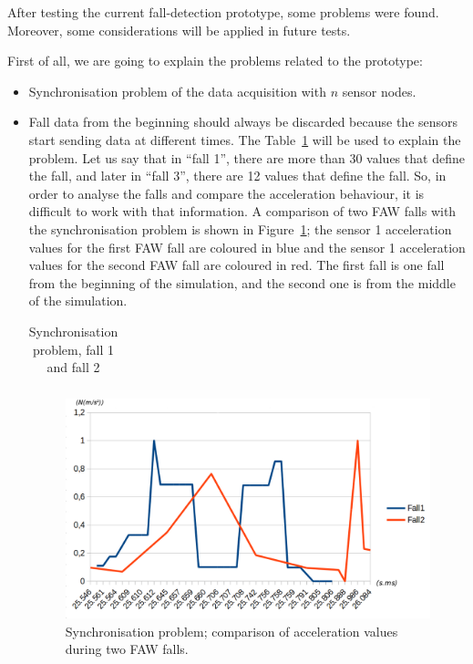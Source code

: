 \documentclass[journal]{IEEEtran}
\begin{document}
After testing the current fall-detection prototype, some problems were 
found. Moreover, some considerations will be applied in future tests.

First of all, we are going to explain the problems related to the prototype: 

\begin{itemize}
 \item Synchronisation problem of the data acquisition with $n$ sensor nodes.
 \item Fall data from the beginning should always be discarded because
   the sensors start sending data at different times. The
   Table~\ref{tabla:Synchro} will be used to explain the problem. Let
   us say  
 that in ``fall 1'', there are more than 30 values that define the fall, and later in ``fall 3'', there are 
 12 values that define the fall. So, in order to analyse the falls and compare the acceleration behaviour, it is 
 difficult to work with that information. A comparison of two FAW falls with the synchronisation problem is shown
 in Figure~\ref{fig:synchronisation1}; the sensor 1 acceleration values for the first FAW fall are coloured in blue and the
 sensor 1 acceleration values for the second FAW fall are coloured in red. The first fall is one fall from the beginning
 of the simulation, and the second one is from the middle of the simulation.
 
 \begin{table}[!ht]
 \centering
 \begin{tabular}{*{5}{r}}
   
 \end{tabular}
 \caption{Synchronisation problem, fall 1 and fall 2}%
 \label{tabla:Synchro}
 \end{table}
 
 \begin{figure}[!ht]
  \centering
  \includegraphics[scale=0.2]{img/synchronisation1.png}
  \caption[Comparison acceleration during two FAW falls]{Synchronisation problem; comparison of acceleration values during two FAW falls.}
  \label{fig:synchronisation1}
 \end{figure}
 

\end{itemize}
\end{document}
